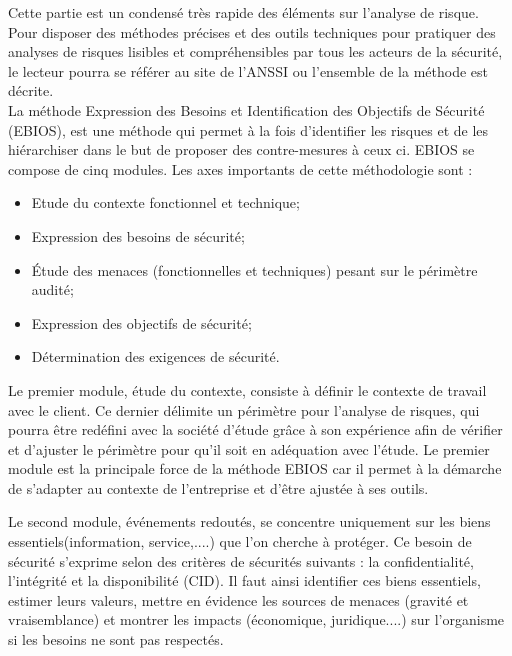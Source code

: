 Cette partie est un condensé très rapide des éléments sur l'analyse de risque. Pour disposer des méthodes précises et des outils techniques pour pratiquer des analyses de risques lisibles et compréhensibles par tous les acteurs de la sécurité, le lecteur pourra se référer au site de l’ANSSI ou l’ensemble de la méthode  est décrite.\\

La méthode Expression des Besoins et Identification des Objectifs de Sécurité (EBIOS), est une méthode qui permet à la fois d’identifier les risques et de les hiérarchiser dans le but de proposer des contre-mesures à ceux ci. 
EBIOS se compose de cinq modules. Les axes importants de cette méthodologie sont :

\begin{itemize}
  \item Etude du contexte fonctionnel et technique;
  \item Expression des besoins de sécurité;
  \item Étude des menaces (fonctionnelles et techniques) pesant sur le périmètre audité;
  \item Expression des objectifs de sécurité;
  \item Détermination des exigences de sécurité.
\end{itemize}

Le premier module, étude du contexte, consiste à définir le contexte de travail avec le client. Ce dernier délimite un périmètre pour l’analyse de risques, qui pourra être redéfini avec la société d’étude grâce à son expérience afin de vérifier et d’ajuster le périmètre pour qu’il soit en adéquation avec l’étude. Le premier module est la principale force de la méthode EBIOS car il permet à la démarche de s’adapter au contexte de l’entreprise et d’être ajustée à ses outils.

Le second module, événements redoutés, se concentre uniquement sur les biens essentiels(information, service,....) que l’on cherche à protéger. Ce besoin de sécurité s’exprime selon des critères de sécurités suivants : la confidentialité, l’intégrité et la disponibilité (CID). Il faut ainsi identifier ces biens essentiels, estimer leurs valeurs, mettre en évidence les sources de menaces (gravité et vraisemblance) et montrer les impacts (économique, juridique....) sur l’organisme si les besoins ne sont pas respectés.

